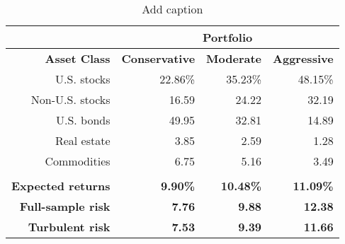 \begin{table}[htbp]
  \centering
  \caption{Add caption}
    \begin{tabular}{rrrr}
    \toprule
          & \multicolumn{3}{c}{\textbf{Portfolio}} \\
    \midrule
    \textbf{Asset Class} & \textbf{Conservative} & \textbf{Moderate} & \textbf{Aggressive} \\
    U.S. stocks & 22.86\% & 35.23\% & 48.15\% \\
    Non-U.S. stocks & 16.59 & 24.22 & 32.19 \\
    U.S. bonds & 49.95 & 32.81 & 14.89 \\
    Real estate & 3.85  & 2.59  & 1.28 \\
    Commodities & 6.75  & 5.16  & 3.49 \\
          &       &       &  \\
    \textbf{Expected returns} & \textbf{9.90\%} & \textbf{10.48\%} & \textbf{11.09\%} \\
    \textbf{Full-sample risk} & \textbf{7.76} & \textbf{9.88} & \textbf{12.38} \\
    \textbf{Turbulent risk} & \textbf{7.53} & \textbf{9.39} & \textbf{11.66} \\
    \bottomrule
    \end{tabular}%
  \label{tab:addlabel}%
\end{table}%
